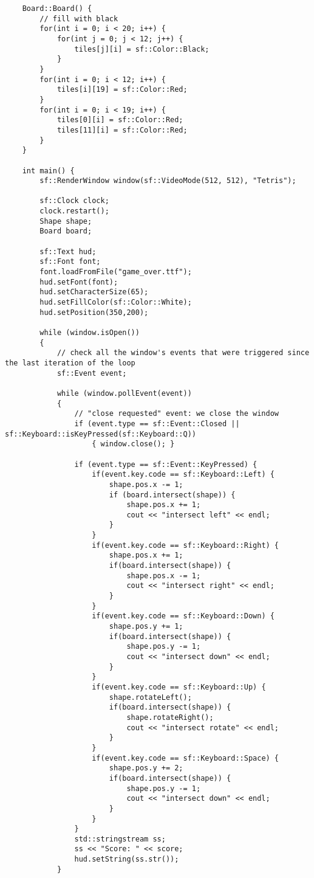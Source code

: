 \documentclass[11pt]{amsart}
\begin{document}
\begin{verbatim}
	Board::Board() {
	    // fill with black
	    for(int i = 0; i < 20; i++) {
	        for(int j = 0; j < 12; j++) {
	            tiles[j][i] = sf::Color::Black;
	        }
	    }
	    for(int i = 0; i < 12; i++) {
	        tiles[i][19] = sf::Color::Red;
	    }
	    for(int i = 0; i < 19; i++) {
	        tiles[0][i] = sf::Color::Red;
	        tiles[11][i] = sf::Color::Red;
	    }
	}

	int main() {
	    sf::RenderWindow window(sf::VideoMode(512, 512), "Tetris");

	    sf::Clock clock;
	    clock.restart();
	    Shape shape;
	    Board board;

	    sf::Text hud;
	    sf::Font font;
	    font.loadFromFile("game_over.ttf");
	    hud.setFont(font);
	    hud.setCharacterSize(65);
	    hud.setFillColor(sf::Color::White);
	    hud.setPosition(350,200);

	    while (window.isOpen())
	    {
	        // check all the window's events that were triggered since the last iteration of the loop
	        sf::Event event;

	        while (window.pollEvent(event))
	        {
	            // "close requested" event: we close the window
	            if (event.type == sf::Event::Closed || sf::Keyboard::isKeyPressed(sf::Keyboard::Q))
	                { window.close(); }

	            if (event.type == sf::Event::KeyPressed) {
	                if(event.key.code == sf::Keyboard::Left) {
	                    shape.pos.x -= 1;
	                    if (board.intersect(shape)) {
	                        shape.pos.x += 1;
	                        cout << "intersect left" << endl;
	                    }
	                }
	                if(event.key.code == sf::Keyboard::Right) {
	                    shape.pos.x += 1;
	                    if(board.intersect(shape)) {
	                        shape.pos.x -= 1;
	                        cout << "intersect right" << endl;
	                    }
	                }
	                if(event.key.code == sf::Keyboard::Down) {
	                    shape.pos.y += 1;
	                    if(board.intersect(shape)) {
	                        shape.pos.y -= 1;
	                        cout << "intersect down" << endl;
	                    }
	                }
	                if(event.key.code == sf::Keyboard::Up) {
	                    shape.rotateLeft();
	                    if(board.intersect(shape)) {
	                        shape.rotateRight();
	                        cout << "intersect rotate" << endl;
	                    }
	                }
	                if(event.key.code == sf::Keyboard::Space) {
	                    shape.pos.y += 2;
	                    if(board.intersect(shape)) {
	                        shape.pos.y -= 1;
	                        cout << "intersect down" << endl;
	                    }
	                }
	            }
	            std::stringstream ss;
	            ss << "Score: " << score;
	            hud.setString(ss.str());
	        }


\end{verbatim}
\end{document}
